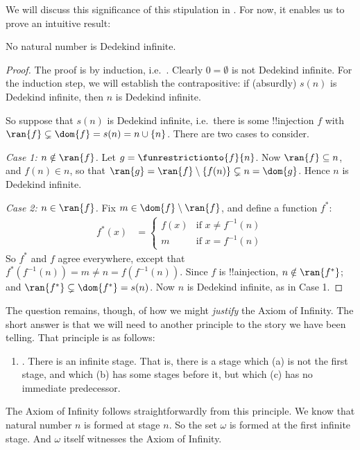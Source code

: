 \documentclass[../../../include/open-logic-section]{subfiles}
\begin{document}
We will discuss this significance of this stipulation in . For now, it enables us to prove an intuitive result:
\begin{prop}
	No natural number is Dedekind infinite.
\end{prop}
\begin{proof}
	The proof is by induction, i.e.\ . Clearly $0 = \emptyset$ is not Dedekind infinite. For the induction step, we will establish the contrapositive: if (absurdly) $s(n)$ is Dedekind infinite, then $n$ is Dedekind infinite. 
	
	So suppose that $s(n)$ is Dedekind infinite, i.e.\ there is some !!{injection} $f$ with $\ran{f}\subsetneq \dom{f} = s(n) = n \cup \{n\}$. There are two cases to consider. 
	
	\emph{Case 1: $n \notin \ran{f}$.} Let $g = \funrestrictionto{f}{n}$. Now $\ran{f} \subseteq n$, and $f(n) \in n$, so that $\ran{g} = \ran{f} \setminus \{f(n)\} \subsetneq n = \dom{g}$. Hence $n$ is Dedekind infinite. 
	
	\emph{Case 2: $n \in \ran{f}$.} Fix $m \in \dom{f} \setminus \ran{f}$, and define a function $f^*$:
	\begin{align*}
		f^*(x) &= 
		\begin{cases}
			f(x)&\text{if }x \neq f^{-1}(n)\\
			m&\text{if }x = f^{-1}(n)
		\end{cases}
	\end{align*}
	So $f^*$ and $f$ agree everywhere, except that $f^*(f^{-1}(n)) = m \neq n = f(f^{-1}(n))$. Since $f$ is !!a{injection}, $n \notin \ran{f^*}$; and $\ran{f^*}\subsetneq \dom{f^*} = s(n)$. Now $n$ is Dedekind infinite, as in Case 1.
\end{proof}\noindent
The question remains, though, of how we might \emph{justify} the Axiom of Infinity. The short answer is that we will need to another principle to the story we have been telling. That principle is as follows:
\begin{enumerate}
	\item[] \stagesinf. There is an infinite stage. That is, there is a stage which (a) is not the first stage, and which (b) has some stages before it, but which (c) has no immediate predecessor.
\end{enumerate}
The Axiom of Infinity follows straightforwardly from this principle. We know that natural number $n$ is formed at stage $n$. So the set $\omega$ is formed at the first infinite stage. And $\omega$ itself witnesses the Axiom of Infinity. 
\end{document}
